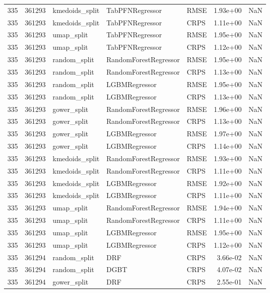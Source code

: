 \begin{tabular}{rrlllrr}
335 & 361293 & kmedoids\_split & TabPFNRegressor & RMSE & 1.93e+00 & NaN \\
335 & 361293 & kmedoids\_split & TabPFNRegressor & CRPS & 1.11e+00 & NaN \\
335 & 361293 & umap\_split & TabPFNRegressor & RMSE & 1.95e+00 & NaN \\
335 & 361293 & umap\_split & TabPFNRegressor & CRPS & 1.12e+00 & NaN \\
335 & 361293 & random\_split & RandomForestRegressor & RMSE & 1.95e+00 & NaN \\
335 & 361293 & random\_split & RandomForestRegressor & CRPS & 1.13e+00 & NaN \\
335 & 361293 & random\_split & LGBMRegressor & RMSE & 1.95e+00 & NaN \\
335 & 361293 & random\_split & LGBMRegressor & CRPS & 1.13e+00 & NaN \\
335 & 361293 & gower\_split & RandomForestRegressor & RMSE & 1.96e+00 & NaN \\
335 & 361293 & gower\_split & RandomForestRegressor & CRPS & 1.13e+00 & NaN \\
335 & 361293 & gower\_split & LGBMRegressor & RMSE & 1.97e+00 & NaN \\
335 & 361293 & gower\_split & LGBMRegressor & CRPS & 1.14e+00 & NaN \\
335 & 361293 & kmedoids\_split & RandomForestRegressor & RMSE & 1.93e+00 & NaN \\
335 & 361293 & kmedoids\_split & RandomForestRegressor & CRPS & 1.11e+00 & NaN \\
335 & 361293 & kmedoids\_split & LGBMRegressor & RMSE & 1.92e+00 & NaN \\
335 & 361293 & kmedoids\_split & LGBMRegressor & CRPS & 1.11e+00 & NaN \\
335 & 361293 & umap\_split & RandomForestRegressor & RMSE & 1.94e+00 & NaN \\
335 & 361293 & umap\_split & RandomForestRegressor & CRPS & 1.11e+00 & NaN \\
335 & 361293 & umap\_split & LGBMRegressor & RMSE & 1.95e+00 & NaN \\
335 & 361293 & umap\_split & LGBMRegressor & CRPS & 1.12e+00 & NaN \\
335 & 361294 & random\_split & DRF & CRPS & 3.66e-02 & NaN \\
335 & 361294 & random\_split & DGBT & CRPS & 4.07e-02 & NaN \\
335 & 361294 & gower\_split & DRF & CRPS & 2.55e-01 & NaN \\

\end{tabular}
